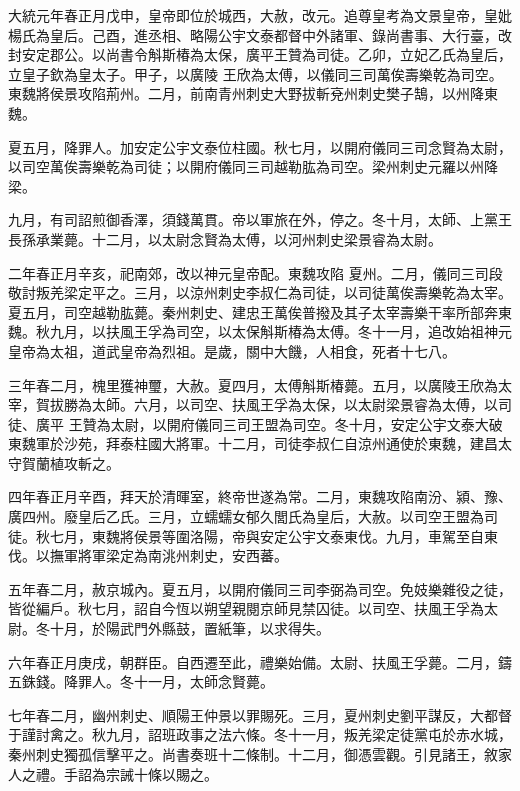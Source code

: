 \begin{pinyinscope}
 大統元年春正月戊申，皇帝即位於城西，大赦，改元。追尊皇考為文景皇帝，皇妣楊氏為皇后。己酉，進丞相、略陽公宇文泰都督中外諸軍、錄尚書事、大行臺，改封安定郡公。以尚書令斛斯椿為太保，廣平王贊為司徒。乙卯，立妃乙氏為皇后，立皇子欽為皇太子。甲子，以廣陵
 王欣為太傅，以儀同三司萬俟壽樂乾為司空。東魏將侯景攻陷荊州。二月，前南青州刺史大野拔斬兗州刺史樊子鵠，以州降東魏。



 夏五月，降罪人。加安定公宇文泰位柱國。秋七月，以開府儀同三司念賢為太尉，以司空萬俟壽樂乾為司徒；以開府儀同三司越勒肱為司空。梁州刺史元羅以州降梁。



 九月，有司詔煎御香澤，須錢萬貫。帝以軍旅在外，停之。冬十月，太師、上黨王長孫承業薨。十二月，以太尉念賢為太傅，以河州刺史梁景睿為太尉。



 二年春正月辛亥，祀南郊，改以神元皇帝配。東魏攻陷
 夏州。二月，儀同三司段敬討叛羌梁定平之。三月，以涼州刺史李叔仁為司徒，以司徒萬俟壽樂乾為太宰。夏五月，司空越勒肱薨。秦州刺史、建忠王萬俟普撥及其子太宰壽樂干率所部奔東魏。秋九月，以扶風王孚為司空，以太保斛斯椿為太傅。冬十一月，追改始祖神元皇帝為太祖，道武皇帝為烈祖。是歲，關中大饑，人相食，死者十七八。



 三年春二月，槐里獲神璽，大赦。夏四月，太傅斛斯椿薨。五月，以廣陵王欣為太宰，賀拔勝為太師。六月，以司空、扶風王孚為太保，以太尉梁景睿為太傅，以司徒、廣平
 王贊為太尉，以開府儀同三司王盟為司空。冬十月，安定公宇文泰大破東魏軍於沙苑，拜泰柱國大將軍。十二月，司徒李叔仁自涼州通使於東魏，建昌太守賀蘭植攻斬之。



 四年春正月辛酉，拜天於清暉室，終帝世遂為常。二月，東魏攻陷南汾、潁、豫、廣四州。廢皇后乙氏。三月，立蠕蠕女郁久閭氏為皇后，大赦。以司空王盟為司徒。秋七月，東魏將侯景等圍洛陽，帝與安定公宇文泰東伐。九月，車駕至自東伐。以撫軍將軍梁定為南洮州刺史，安西蕃。



 五年春二月，赦京城內。夏五月，以開府儀同三司李弼為司空。免妓樂雜役之徒，皆從編戶。秋七月，詔自今恆以朔望親閱京師見禁囚徒。以司空、扶風王孚為太尉。冬十月，於陽武門外縣鼓，置紙筆，以求得失。



 六年春正月庚戌，朝群臣。自西遷至此，禮樂始備。太尉、扶風王孚薨。二月，鑄五銖錢。降罪人。冬十一月，太師念賢薨。



 七年春二月，幽州刺史、順陽王仲景以罪賜死。三月，夏州刺史劉平謀反，大都督于謹討禽之。秋九月，詔班政事之法六條。冬十一月，叛羌梁定徒黨屯於赤水城，
 秦州刺史獨孤信擊平之。尚書奏班十二條制。十二月，御憑雲觀。引見諸王，敘家人之禮。手詔為宗誡十條以賜之。




\end{pinyinscope}
